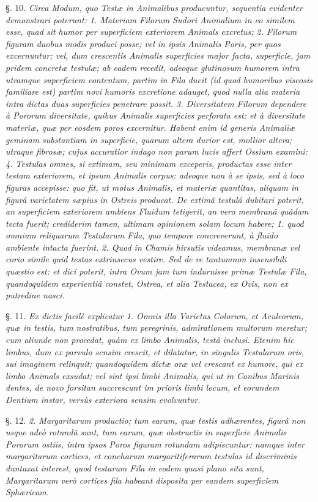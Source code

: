 \documentclass[a4paper, 11pt, oneside, polutonikogreek, german]{article}
\begin{document}
§. 10. \emph{Circa Modum, quo Testæ in Animalibus producuntur, sequentia evidenter demonstrari poterunt: 1. Materiam Filorum Sudori Animalium in eo similem esse, quad sit humor per superficiem exteriorem Animals excretus; 2. Filorum figuram duobus modis produci posse; vel in ipsis Animalis Poris, per quos excernuntur; vel, dum crescentis Animalis superficies major facta, superficie, jam pridem concretæ testulæ; ab eadem recedit, adeoque glutinosum humorem intra utramque superficiem contentum, partim in Fila ducit (id quod humoribus viscosis familiare est) partim novi humoris excretione adauget, quod nulla alia materia intra dictas duas superficies penetrare possit. 3. Diversitatem Filorum dependere à Pororum diversitate, quibus Animalis superficies perforata est; et à diversitate materiæ, quæ per eosdem poros excernitur. Habent enim id generis Animaliæ geminam substantiam in superficie, quarum altera durior est, mollior altera; utraque fibrosæ; cujus accuratior indago non parum lucis affert Ossium examini: 4. Testulas omnes, si extimam, seu minimam exceperis, productas esse inter testam exteriorem, et ipsum Animalis corpus: adeoque non à se ipsis, sed à loco figuras accepisse: quo fit, ut motus Animalis, et materiæ quantitas, aliquam in figurâ varietatem sæpius in Ostreis producat. De extimâ testulâ dubitari poterit, an superficiem exteriorem ambiens Fluidum tetigerit, an vero membranâ quâdam tecta fuerit; crediderim tamen, ultimam opinionem solam locum habere; 1. quod omnium reliquarum Testularum Fila, quo tempore concreverunt, à fluido ambiente intacta fuerint. 2. Quod in Chamis hirsutis videamus, membranæ vel corio simile quid testas extrinsecus vestire. Sed de re tantumnon insensibili quæstio est: et dici poterit, intra Ovum jam tum induruisse primæ Testulæ Fila, quandoquidem experientiâ constet, Ostrea, et alia Testacea, ex Ovis, non ex putredine nasci.}

§. 11. \emph{Ex dictis facilè explicatur 1. Omnis illa Varietas Colorum, et Aculeorum, quæ in testis, tum nostratibus, tum peregrinis, admirationem multorum meretur; cum aliunde non procedat, quàm ex limbo Animalis, testâ inclusi. Etenim hic limbus, dum ex parvulo sensim crescit, et dilatatur, in singulis Testularum oris, sui imaginem relinquit; quandoquidem dictæ oræ vel crescant ex humore, qui ex limbo Animals exsudat; vel sint ipsi limbi Animalis, qui ut in Canibus Marinis dentes, de novo forsitan succrescunt im prioris limbi locum, et eorundem Dentium instar, versùs exteriora sensim evolvuntur.}

§. 12. \emph{2. Margaritarum productio; tum earum, quæ testis adhærentes, figurâ non usque adeò rotundâ sunt, tum earum, quæ obstructis in superficie Animalis Pororum ostiis, intra ipsos Poros figuram rotundam adipiscuntur: namque inter margaritarum cortices, et concharum margaritiferarum testulas id discriminis duntaxat interest, quod testarum Fila in eodem quasi plano sita sunt, Margaritarum verò cortices fila habeant disposita per eandem superficiem Sphæricam.}
\end{document}
